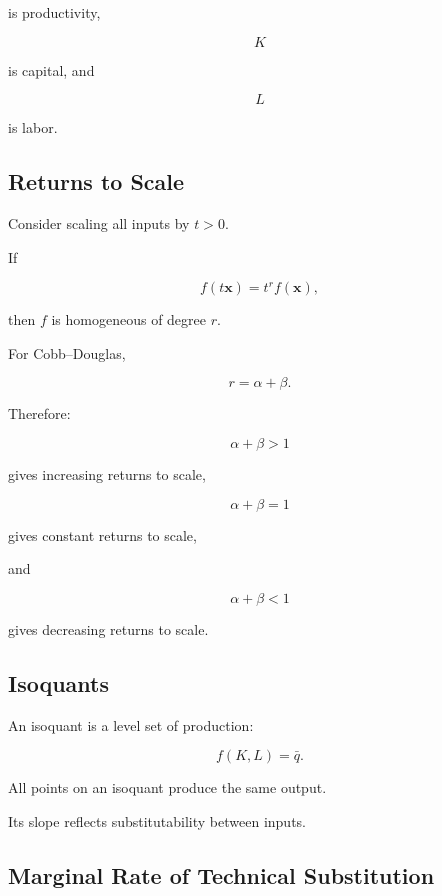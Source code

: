is productivity,

\[
K
\]

is capital, and

\[
L
\]

is labor.

\subsection{Returns to Scale}
\label{subsec:returns-to-scale}

Consider scaling all inputs by \(t>0\).

If

\[
f(t\mathbf{x})
=
t^rf(\mathbf{x}),
\]

then \(f\) is homogeneous of degree \(r\).

For Cobb--Douglas,

\[
\boxed{
r=\alpha+\beta.
}
\]

Therefore:

\[
\boxed{
\alpha+\beta>1
}
\]

gives increasing returns to scale,

\[
\boxed{
\alpha+\beta=1
}
\]

gives constant returns to scale,

and

\[
\boxed{
\alpha+\beta<1
}
\]

gives decreasing returns to scale.

\subsection{Isoquants}
\label{subsec:isoquants}

An isoquant is a level set of production:

\[
\boxed{
f(K,L)=\bar q.
}
\]

All points on an isoquant produce the same output.

Its slope reflects substitutability between inputs.

\subsection{Marginal Rate of Technical Substitution}
\label{subsec:mrts}

